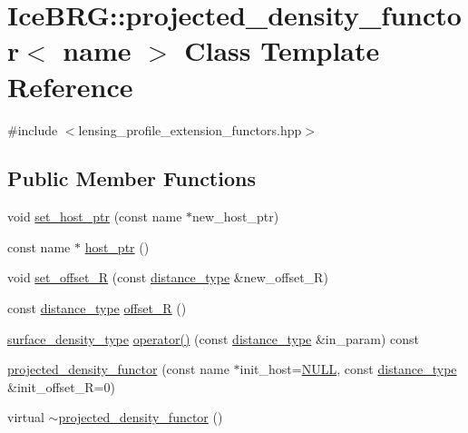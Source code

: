 \hypertarget{classIceBRG_1_1projected__density__functor}{}\section{Ice\+B\+R\+G\+:\+:projected\+\_\+density\+\_\+functor$<$ name $>$ Class Template Reference}
\label{classIceBRG_1_1projected__density__functor}


{\ttfamily \#include $<$lensing\+\_\+profile\+\_\+extension\+\_\+functors.\+hpp$>$}

\subsection*{Public Member Functions}
\begin{DoxyCompactItemize}
\item 
void \hyperlink{classIceBRG_1_1projected__density__functor_a083e88c53aff6221e1356050c1e2d118}{set\+\_\+host\+\_\+ptr} (const name $\ast$new\+\_\+host\+\_\+ptr)
\item 
const name $\ast$ \hyperlink{classIceBRG_1_1projected__density__functor_ae5ec52d5fd90d15774e9993101333aa8}{host\+\_\+ptr} ()
\item 
void \hyperlink{classIceBRG_1_1projected__density__functor_af86b2bab997ee46dc3fd21487e22981a}{set\+\_\+offset\+\_\+\+R} (const \hyperlink{namespaceIceBRG_a45499647eb87e24c10ab32c628711cec}{distance\+\_\+type} \&new\+\_\+offset\+\_\+\+R)
\item 
const \hyperlink{namespaceIceBRG_a45499647eb87e24c10ab32c628711cec}{distance\+\_\+type} \hyperlink{classIceBRG_1_1projected__density__functor_af5d05065784a2eee5862199e76ba9327}{offset\+\_\+\+R} ()
\item 
\hyperlink{namespaceIceBRG_a80c597ef5ba0a32491d32a9f0083b02d}{surface\+\_\+density\+\_\+type} \hyperlink{classIceBRG_1_1projected__density__functor_aa03137511e069438efdf1698ac1dffd7}{operator()} (const \hyperlink{namespaceIceBRG_a45499647eb87e24c10ab32c628711cec}{distance\+\_\+type} \&in\+\_\+param) const 
\item 
\hyperlink{classIceBRG_1_1projected__density__functor_a97a1457b6e3d8a36fa4cb364d0728169}{projected\+\_\+density\+\_\+functor} (const name $\ast$init\+\_\+host=\hyperlink{lib_2IceBRG__main_2common_8h_a070d2ce7b6bb7e5c05602aa8c308d0c4}{N\+U\+L\+L}, const \hyperlink{namespaceIceBRG_a45499647eb87e24c10ab32c628711cec}{distance\+\_\+type} \&init\+\_\+offset\+\_\+\+R=0)
\item 
virtual \hyperlink{classIceBRG_1_1projected__density__functor_a2e842a2eac755b6ed5f3c0a4ec761e0a}{$\sim$projected\+\_\+density\+\_\+functor} ()
\end{DoxyCompactItemize}


